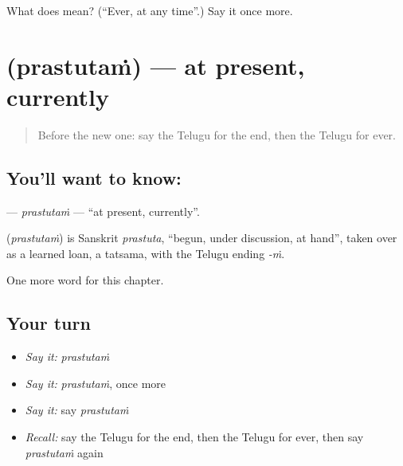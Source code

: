 \begin{tcolorbox}[breakable,colback=teal!4,colframe=teal!35!black,title={Before you move on}]
What does  mean? (\textquotedblleft{}Ever, at any time\textquotedblright{}.) Say it once more.
\end{tcolorbox}
\section[\texorpdfstring{\te{ప్రస్తుతం} (prastutaṁ)}{ప్రస్తుతం (prastutaṁ)}]{ (prastutaṁ) — at present, currently}

\label{lesson:TE-C253-prastutam}



\begin{quote}
Before the new one: say the Telugu for the end, then the Telugu for ever.
\end{quote}

\subsection*{You'll want to know: }
\textbf{} — \emph{prastutaṁ} — \textquotedblleft{}at present, currently\textquotedblright{}.

\begin{cousinweb}
\textbf{} (\emph{prastutaṁ}) is Sanskrit \emph{prastuta}, \textquotedblleft{}begun, under discussion, at hand\textquotedblright{}, taken over as a learned loan, a tatsama, with the Telugu ending \emph{-ṁ}.
\end{cousinweb}

\begin{grammarlens}[title={What you've built}]
One more word for this chapter.
\end{grammarlens}

\subsection*{Your turn}
\begin{itemize}
\raggedright
  \item \emph{Say it:} \emph{prastutaṁ}
  \item \emph{Say it:} \emph{prastutaṁ}, once more
  \item \emph{Say it:} say \emph{prastutaṁ}
  \item \emph{Recall:} say the Telugu for the end, then the Telugu for ever, then say \emph{prastutaṁ} again
\end{itemize}

